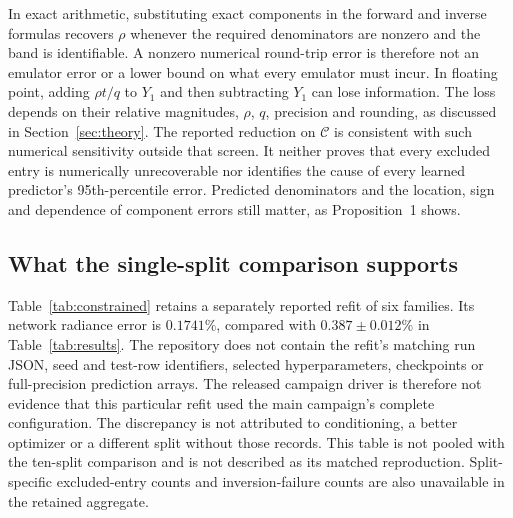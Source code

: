 In exact arithmetic, substituting exact components in the forward and inverse formulas
recovers $\rho$ whenever the required denominators are nonzero and the band is
identifiable. A nonzero numerical round-trip error is therefore not an emulator error
or a lower bound on what every emulator must incur. In floating point, adding
$\rho t/q$ to $Y_1$ and then subtracting $Y_1$ can lose information. The loss depends
on their relative magnitudes, $\rho$, $q$, precision and rounding, as discussed in
Section~\ref{sec:theory}. The reported reduction on $\mathcal C$ is consistent with
such numerical sensitivity outside that screen. It neither proves that every excluded
entry is numerically unrecoverable nor identifies the cause of every learned predictor's
95th-percentile error. Predicted denominators and the location, sign and dependence of
component errors still matter, as Proposition~1 shows.

\subsection{What the single-split comparison supports}
Table~\ref{tab:constrained} retains a separately reported refit of six families. Its
network radiance error is $0.1741\%$, compared with $0.387\pm0.012\%$ in
Table~\ref{tab:results}. The repository does not contain the refit's matching run JSON,
seed and test-row identifiers, selected hyperparameters, checkpoints or full-precision
prediction arrays. The released campaign driver is therefore not evidence that this
particular refit used the main campaign's complete configuration. The discrepancy is
not attributed to conditioning, a better optimizer or a different split without those
records. This table is not pooled with the ten-split comparison and is not described as
its matched reproduction. Split-specific excluded-entry counts and inversion-failure
counts are also unavailable in the retained aggregate.

\begin{table}[t]
\centering
\resizebox{\textwidth}{!}{}
\caption{Retained, separate one-split refit at $\rho=0.7$, not a matched regeneration of
Table~\ref{tab:results}. Reflectance errors are in percentage points; the right-hand
columns use the declared screen $\mathcal C$. Radiance is the reported all-band metric.
The generating manifest, sample-level predictions, test-mask coverage and failure counts
are unavailable. Values are retained without new fitting or rescoring; their exact
scoring conventions cannot be independently checked from this table alone.}
\label{tab:constrained}
\end{table}

